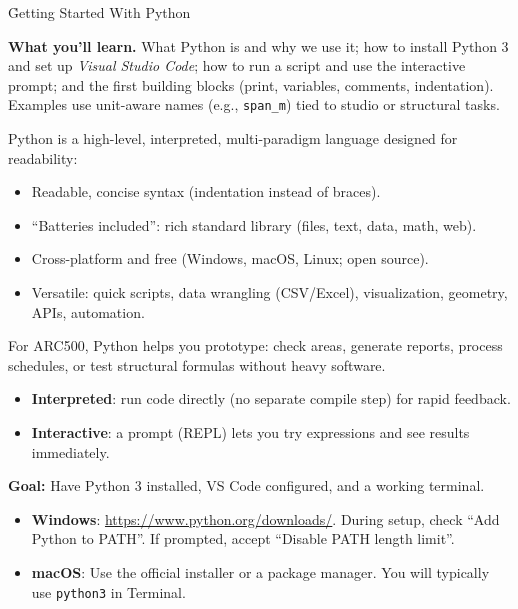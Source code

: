 
\h{Getting Started With Python}

\begin{NoteBox}
\textbf{What you'll learn.} What Python is and why we use it; how to install Python 3 and set up \emph{Visual Studio Code}; how to run a script and use the interactive prompt; and the first building blocks (print, variables, comments, indentation). Examples use unit-aware names (e.g., \texttt{span\_m}) tied to studio or structural tasks.
\end{NoteBox}

Python is a high-level, interpreted, multi-paradigm language designed for readability:
\begin{itemize}
  \item Readable, concise syntax (indentation instead of braces).
  \item ``Batteries included'': rich standard library (files, text, data, math, web).
  \item Cross-platform and free (Windows, macOS, Linux; open source).
  \item Versatile: quick scripts, data wrangling (CSV/Excel), visualization, geometry, APIs, automation.
\end{itemize}
For ARC500, Python helps you prototype: check areas, generate reports, process schedules, or test structural formulas without heavy software.

\begin{itemize}
  \item \textbf{Interpreted}: run code directly (no separate compile step) for rapid feedback.
  \item \textbf{Interactive}: a prompt (REPL) lets you try expressions and see results immediately.
\end{itemize}

\textbf{Goal:} Have Python 3 installed, VS Code configured, and a working terminal.

\begin{itemize}
  \item \textbf{Windows}: \url{https://www.python.org/downloads/}. During setup, check ``Add Python to PATH''. If prompted, accept ``Disable PATH length limit''.
  \item \textbf{macOS}: Use the official installer or a package manager. You will typically use \texttt{python3} in Terminal.
\end{itemize}

